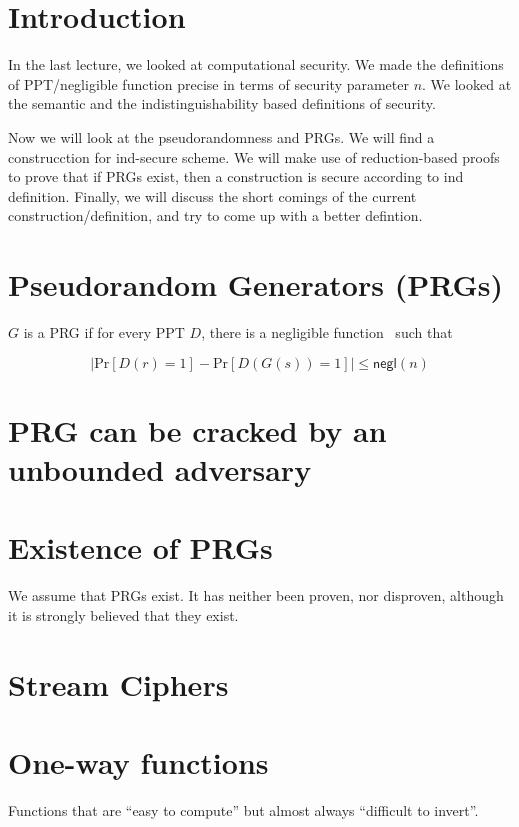 \documentclass[11pt]{article}
\begin{document}


\section{Introduction}

In the last lecture, we looked at computational security. We made the definitions of PPT/negligible function precise in terms of security parameter \(n\). We looked at the semantic and the indistinguishability based definitions of security.

Now we will look at the pseudorandomness and PRGs. We will find a construcction for ind-secure scheme. We will make use of reduction-based proofs to prove that if PRGs exist, then a construction is secure according to ind definition. Finally, we will discuss the short comings of the current construction/definition, and try to come up with a better defintion.  

\section{Pseudorandom Generators (PRGs)}
\(G\) is a PRG if for every PPT \(D\), there is a negligible function \negl\ such that

\[ \lvert \mathrm{Pr}[D(r) = 1] - \mathrm{Pr} [D(G(s)) = 1] \rvert \le \mathsf{negl}(n) \]


\section{PRG can be cracked by an unbounded adversary}

\section{Existence of PRGs}
We assume that PRGs exist. It has neither been proven, nor disproven, although it is strongly believed that they exist.

\section{Stream Ciphers}
\section{One-way functions}
Functions that are ``easy to compute'' but almost always ``difficult to invert''.
\end{document}
